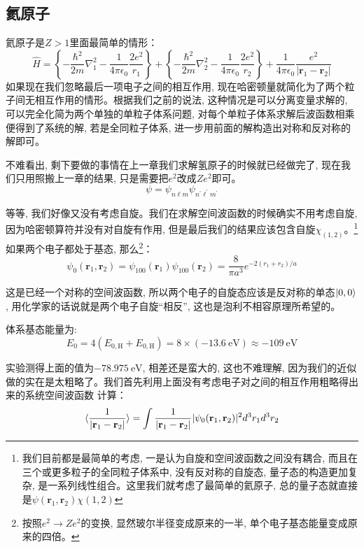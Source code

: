 \documentclass[a4paper,zihao=-4,linespread=1]{ctexrep}
\begin{document}
    \subsection*{氦原子}
    氦原子是$Z>1$里面最简单的情形：
    \begin{equation}
        \hat{H}=\left\{-\frac{\hbar^{2}}{2 m} \nabla_{1}^{2}-\frac{1}{4 \pi \epsilon_{0}} \frac{2 e^{2}}{r_{1}}\right\}+\left\{-\frac{\hbar^{2}}{2 m} \nabla_{2}^{2}-\frac{1}{4 \pi \epsilon_{0}} \frac{2 e^{2}}{r_{2}}\right\}+\frac{1}{4 \pi \epsilon_{0}} \frac{e^{2}}{\left|\mathbf{r}_{1}-\mathbf{r}_{2}\right|}
    \end{equation}
    如果现在我们忽略最后一项电子之间的相互作用, 现在哈密顿量就简化为了两个粒子间无相互作用的情形。根据我们之前的说法, 这种情况是可以分离变量求解的, 可以完全化简为两个单独的单粒子体系问题, 
    对每个单粒子体系求解后波函数相乘便得到了系统的解, 若是全同粒子体系, 进一步用前面的解构造出对称和反对称的解即可。

    不难看出, 剩下要做的事情在上一章我们求解氢原子的时候就已经做完了, 现在我们只用照搬上一章的结果, 只是需要把$e^2$改成$Ze^2$即可。
    \[\psi=\psi_{n\ell m}\psi_{n^\prime\ell^\prime m^\prime}\]

    等等, 我们好像又没有考虑自旋。我们在求解空间波函数的时候确实不用考虑自旋, 因为哈密顿算符并没有对自旋有作用, 但是最后我们的结果应该包含自旋$\chi_(1,2)$。\footnote{我们目前都是最简单的考虑, 一是认为自旋和空间波函数之间没有耦合, 而且在三个或更多粒子的全同粒子体系中, 没有反对称的自旋态, 量子态的构造更加复杂, 是一系列线性组合。这里我们就考虑了最简单的氦原子, 总的量子态就直接是$\psi(\mathbf{r}_1,\mathbf{r}_2)\chi(1,2)$}
    如果两个电子都处于基态, 那么\footnote{按照$e^2\rightarrow Ze^2$的变换, 显然玻尔半径变成原来的一半, 单个电子基态能量变成原来的四倍。}：
    \[\psi_{0}\left(\mathbf{r}_{1}, \mathbf{r}_{2}\right)=\psi_{100}\left(\mathbf{r}_{1}\right) \psi_{100}\left(\mathbf{r}_{2}\right)=\frac{8}{\pi a^{3}} e^{-2\left(r_{1}+r_{2}\right) / a}\]
    
    这是已经一个对称的空间波函数, 所以两个电子的自旋态应该是反对称的单态$\ket{0,0}$, 用化学家的话说就是两个电子自旋“相反”, 这也是泡利不相容原理所希望的。
    
    体系基态能量为:
    \[E_0=4(E_{0,\mathrm{H}}+E_{0,\mathrm{H}})=8\times(\SI{-13.6}{\eV})\approx\SI{-109}{\eV}\]

    实验测得上面的值为$\SI{-78.975}{\eV}$, 相差还是蛮大的, 这也不难理解, 因为我们的近似做的实在是太粗略了。我们首先利用上面没有考虑电子对之间的相互作用粗略得出来的系统空间波函数
    计算：
    \begin{equation}
        \braket{\frac{1}{\left|\mathbf{r}_1-\mathbf{r}_2\right|}}=\int\frac{1}{|\mathbf{r}_1-\mathbf{r}_2|}|\psi_0(\mathbf{r}_1,\mathbf{r}_2)|^2d^3r_1d^3r_2
    \end{equation}
    
\end{document}
